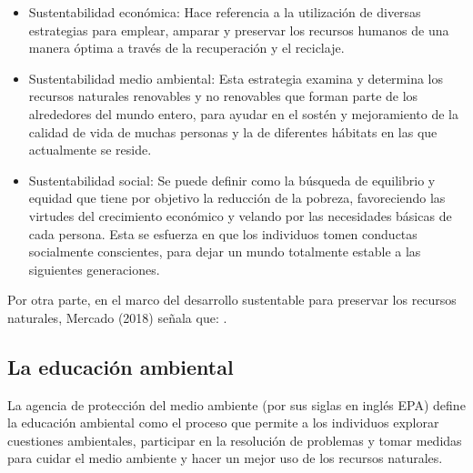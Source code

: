 \begin{itemize}
    \item Sustentabilidad económica: Hace referencia a la utilización de diversas estrategias para emplear, amparar y preservar los recursos humanos de una manera óptima a través de la recuperación y el reciclaje.
    
    \item Sustentabilidad medio ambiental: Esta estrategia examina y determina los recursos naturales renovables y no renovables que forman parte de los alrededores del mundo entero, para ayudar en el sostén y mejoramiento de la calidad de vida de muchas personas y la de diferentes hábitats en las que actualmente se reside.
    
    \item Sustentabilidad social: Se puede definir como la búsqueda de equilibrio y equidad que tiene por objetivo la reducción de la pobreza, favoreciendo las virtudes del crecimiento económico y velando por las necesidades básicas de cada persona. Esta se esfuerza en que los individuos tomen conductas socialmente conscientes, para dejar un mundo totalmente estable a las siguientes generaciones.
\end{itemize}

Por otra parte, en el marco del desarrollo sustentable para preservar los recursos naturales, Mercado (2018) señala que: . 

{\setlength{\parskip}{0cm}
\subsection{La educación ambiental}

La agencia de protección del medio ambiente (por sus siglas en inglés EPA) define la educación ambiental como el proceso que permite a los individuos explorar cuestiones ambientales, participar en la resolución de problemas y tomar medidas para cuidar el medio ambiente y hacer un mejor uso de los recursos naturales.
}

